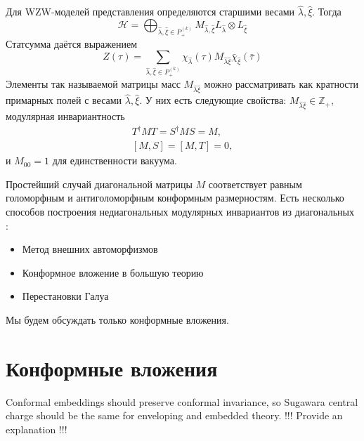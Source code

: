 \documentclass[a4paper,12pt]{article}
\theoremstyle{definition} \newtheorem{Def}{Definition}
\begin{document}
Для WZW-моделей представления определяются старшими весами $\hat \lambda, \hat \xi$. Тогда
\begin{equation}
  \label{eq:6}
  \mathcal{H}=\bigoplus_{\hat \lambda,\hat \xi\in P^{(k)}_{+}}M_{\hat \lambda,\hat \xi} L_{\hat \lambda}\otimes L_{\hat \xi}
\end{equation}
Статсумма даётся выражением
\begin{equation}
  \label{eq:7}
  Z(\tau)=\sum_{\hat \lambda,\hat \xi\in P^{(k)}_{+}} \chi_{\hat \lambda}(\tau)M_{\hat \lambda\hat\xi}\bar \chi_{\hat \xi}(\bar \tau)
\end{equation}
Элементы так называемой матрицы масс $M_{\hat \lambda\hat\xi}$ можно рассматривать как кратности примарных полей с весами $\hat\lambda,\hat \xi$. У них есть следующие свойства: $M_{\hat \lambda\hat\xi}\in \mathbb{Z}_+$, модулярная инвариантность
\begin{equation}
  \label{eq:8}
  \begin{aligned}
    T^{\dagger}MT=S^{\dagger}MS=M,\\
    [M,S]=[M,T]=0,
  \end{aligned}
\end{equation}
и $M_{00}=1$ для единственности вакуума.

Простейший случай диагональной матрицы $M$ соответствует равным голоморфным и антиголоморфным конформным размерностям. Есть несколько способов построения недиагональных модулярных инвариантов из диагональных \cite{difrancesco1997cft}:
\begin{itemize}
\item Метод внешних автоморфизмов
\item Конформное вложение в большую теорию
\item Перестановки Галуа
\end{itemize}
Мы будем обсуждать только конформные вложения.

\section{Конформные вложения}
\label{sec:conformal-embeddings}
Conformal embeddings should preserve conformal invariance, so Sugawara central charge should be the same for enveloping and embedded theory. !!! Provide an explanation !!!
\end{document}

